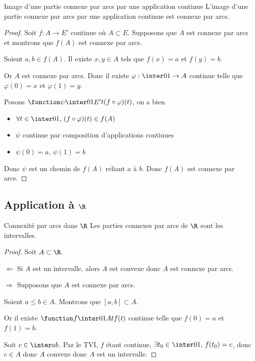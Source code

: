 \begin{theoreme}{Image d'une partie connexe par arcs par une application continue}{}
    L'image d'une partie connexe par arcs par une application continue est connexe par arcs.
\end{theoreme}

\begin{proof}
    Soit $f : A \to E'$ continue où $A \subset E$. Supposons que 
    $A$ est connexe par arcs et montrons que $f(A)$ est connexe par arcs. 

    Soient $a, b \in f(A)$. Il existe $x, y \in A$ tels que $f(x) = a$ et $f(y) = b$.
     
    Or $A$ est connexe par arcs. 
    Donc il existe $\varphi : \inter 0 1 \to A$ continue telle que $\varphi(0) = x$ et $\varphi(1) = y$.

    Posons $\fonction \psi {\inter 0 1}{E'} t { (f \circ \varphi)(t)}$, on a bien 

    \begin{itemize}
        \item $\forall t \in \inter 0 1, \, (f \circ \varphi) (t) \in f(A) $ 
        \item $\psi$ continue par composition d'applications continues
        \item $\psi(0) = a, \, \psi(1) = b$
    \end{itemize}

    Donc $\psi $ est un chemin de $f(A)$ reliant $a$ à $b$. Donc $f(A)$ est connexe par arcs.
\end{proof}

\subsection{Application à \texorpdfstring{$\R$}{R}}

\begin{theoreme}{Connexité par arcs dans $\R$}{}
    Les parties connexes par arcs de $\R$ sont les intervalles.
\end{theoreme}


\begin{proof}
    Soit $A \subset \R$. 

    $\Leftarrow$ Si $A$ est un intervalle, alors $A$ est convexe donc $A$ est connexe par arcs.

    $\Rightarrow$ Supposons que $A$ est connexe par arcs. 

    Soient $a \leqslant b \in A$. Montrons que $[a, b] \subset A$.

    Or il existe $\fonction f {\inter 0 1} A t {f(t)}$ continue telle que $f(0) = a$ et $f(1) = b$.

    Soit $c \in \inter a b$. Par le TVI, $f$ étant continue, $\exists t_0 \in \inter 0 1, \, f(t_0) = c$, 
    donc $c \in A$ donc $A$ convexe donc $A$ est un intervalle.
\end{proof}

